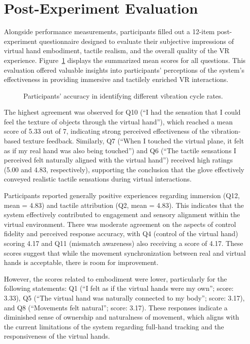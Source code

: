\section{Post-Experiment Evaluation}
Alongside performance measurements, participants filled out a 12-item post-experiment questionnaire designed to evaluate their subjective impressions of virtual hand embodiment, tactile realism, and the overall quality of the VR experience. Figure~\ref{fig:questionnaire_results} displays the summarized mean scores for all questions. This evaluation offered valuable insights into participants' perceptions of the system's effectiveness in providing immersive and tactilely enriched VR interactions.

\begin{figure}[H]\centering
	
	\caption{Participants' accuracy in identifying different vibration cycle rates.}\label{fig:questionnaire_results}
\end{figure}

The highest agreement was observed for Q10 (“I had the sensation that I could feel the texture of objects through the virtual hand”), which reached a mean score of 5.33 out of 7, indicating strong perceived effectiveness of the vibration-based texture feedback. Similarly, Q7 (“When I touched the virtual plane, it felt as if my real hand was also being touched”) and Q6 (“The tactile sensations I perceived felt naturally aligned with the virtual hand”) received high ratings (5.00 and 4.83, respectively), supporting the conclusion that the glove effectively conveyed realistic tactile sensations during virtual interactions.

Participants reported generally positive experiences regarding immersion (Q12, mean = 4.83) and tactile attribution (Q2, mean = 4.83). This indicates that the system effectively contributed to engagement and sensory alignment within the virtual environment. There was moderate agreement on the aspects of control fidelity and perceived response accuracy, with Q4 (control of the virtual hand) scoring 4.17 and Q11 (mismatch awareness) also receiving a score of 4.17. These scores suggest that while the movement synchronization between real and virtual hands is acceptable, there is room for improvement.

However, the scores related to embodiment were lower, particularly for the following statements: Q1 (“I felt as if the virtual hands were my own”; score: 3.33), Q5 (“The virtual hand was naturally connected to my body”; score: 3.17), and Q8 (“Movements felt natural”; score: 3.17). These responses indicate a diminished sense of ownership and naturalness of movement, which aligns with the current limitations of the system regarding full-hand tracking and the responsiveness of the virtual hands.

